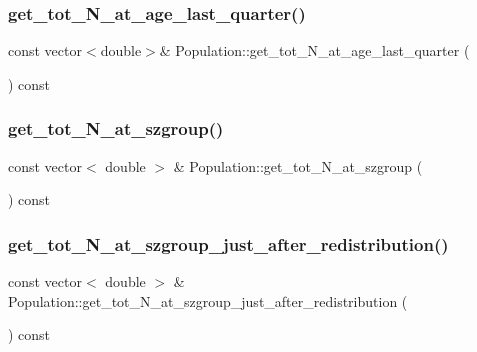 \mbox{\label{class_population_a0b8d93dced62bc25ff70be9e1159230d}} 
\subsubsection{\texorpdfstring{get\_tot\_N\_at\_age\_last\_quarter()}{get\_tot\_N\_at\_age\_last\_quarter()}}
{\footnotesize\ttfamily const vector$<$double$>$\& Population\+::get\+\_\+tot\+\_\+\+N\+\_\+at\+\_\+age\+\_\+last\+\_\+quarter (\begin{DoxyParamCaption}{ }\end{DoxyParamCaption}) const}

\mbox{\label{class_population_a9f2f01dc06493d6b534db38a3251b70e}} 
\subsubsection{\texorpdfstring{get\_tot\_N\_at\_szgroup()}{get\_tot\_N\_at\_szgroup()}}
{\footnotesize\ttfamily const vector$<$ double $>$ \& Population\+::get\+\_\+tot\+\_\+\+N\+\_\+at\+\_\+szgroup (\begin{DoxyParamCaption}{ }\end{DoxyParamCaption}) const}

\mbox{\label{class_population_af5b3468bd3ecb69030f2f6a59e10253a}} 
\subsubsection{\texorpdfstring{get\_tot\_N\_at\_szgroup\_just\_after\_redistribution()}{get\_tot\_N\_at\_szgroup\_just\_after\_redistribution()}}
{\footnotesize\ttfamily const vector$<$ double $>$ \& Population\+::get\+\_\+tot\+\_\+\+N\+\_\+at\+\_\+szgroup\+\_\+just\+\_\+after\+\_\+redistribution (\begin{DoxyParamCaption}{ }\end{DoxyParamCaption}) const}

